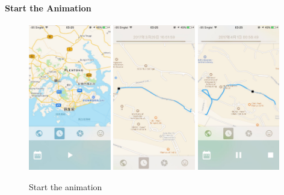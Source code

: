 \documentclass[12pt,a4paper]{article}
\begin{document}
                \paragraph{Start the Animation}
                \label{sec:start-animation}
                \begin{figure}[H]
                    \includegraphics[width=0.32\textwidth]{2-4-2-1-a}
                    \includegraphics[width=0.32\textwidth]{2-4-2-1-b}
                    \includegraphics[width=0.32\textwidth]{2-4-2-1-c}
                    \centering
                    \caption{Start the animation}
                    \label{fig:start-animation}
                \end{figure}
                
\end{document}
